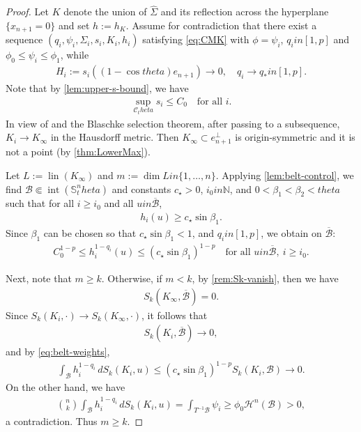 \documentclass[12pt]{amsart}
\def\theta{theta}%
\def\in{in }%
\numberwithin{equation}{section}
\newcommand{\bbN}{\mathbb{N}}
\newcommand{\8}{\infty}
\newcommand{\cB}{\mathcal{B}}
\newcommand{\cC}{\mathcal{C}}
\newcommand{\cH}{\mathcal{H}}
\newcommand{\eq}[1]{\begin{equation}\begin{alignedat}{2}#1\end{alignedat}\end{equation}}
\newcommand{\Cth}{\cC_\theta}
\begin{document}
\begin{proof}
Let $K$ denote the union of $\widehat{\Sigma}$ and its reflection across the hyperplane $\{x_{n+1}=0\}$ and set $h:=h_K$.
Assume for contradiction that there exist a sequence $(q_i,\psi_i,\Sigma_i,s_i,K_i,h_i)$ satisfying \eqref{eq:CMK} with $\phi=\psi_i$, $q_i\in [1,p]$ and $\phi_0\le\psi_i\le\phi_1$, while
\eq{
H_i:=s_i((1-\cos\theta)e_{n+1})\to 0,
\quad
q_i\to q_{\ast}\in [1,p].
}
Note that by \autoref{lem:upper-s-bound}, we have
\eq{
\sup_{\Cth} s_i\le C_0 \quad\text{for all }i.
}
In view of \cite[Lem. 4.2]{HIS25} and the Blaschke selection theorem, after passing to a subsequence, $K_i\to K_\infty$ in the Hausdorff metric. Then $K_\infty\subset e_{n+1}^\perp$ is origin-symmetric and it is not a point (by \autoref{thm:LowerMax}).


Let $L:=\operatorname{lin}(K_\infty)$ and $m:=\dim L\in\{1,\dots,n\}$. Applying \autoref{lem:belt-control}, we find $\mathcal{B}\Subset\operatorname{int}(\mathbb{S}^n_\theta)$ and constants $c_{\star}>0$, $i_0\in\bbN$, and $0<\beta_1<\beta_2<\theta$ such that
for all $i\ge i_0$ and all $u\in\overline{\cB}$,
\eq{
h_i(u)\ge c_{\star}\sin\beta_1.
}
Since $\beta_1$ can be chosen so that $c_{\star}\sin\beta_1<1$, and $q_i\in[1,p]$, we obtain on $\overline{\cB}$:
\eq{\label{eq:belt-weights}
C_0^{1-p}\le h_i^{1-q_i}(u)\le (c_{\star}\sin\beta_1)^{1-p}\quad\text{for all }u\in\overline{\cB},\ i\ge i_0.
}

Next, note that $m\ge k$. Otherwise, if $m<k$, by \autoref{rem:Sk-vanish}, then we have
\eq{
S_k(K_\infty,\overline{\cB})=0.
}
Since $S_k(K_i,\cdot)\to S_k(K_\infty,\cdot)$, it follows that
\eq{
S_k(K_i,\overline{\cB})\to 0,
}
and by \eqref{eq:belt-weights},
\eq{
\int_{\cB} h_i^{1-q_i}\,dS_k(K_i,u)
\le (c_{\star}\sin\beta_1)^{1-p} S_k(K_i,\cB)\to 0.
}
On the other hand, we have
\eq{
\binom{n}{k}\int_{\cB} h_i^{1-q_i}\,dS_k(K_i,u)
= \int_{T^{-1}\cB}\psi_i
\ge  \phi_0 \cH^n(\cB)>0,
}
a contradiction. Thus $m\ge k$.


\end{proof}
\end{document}
